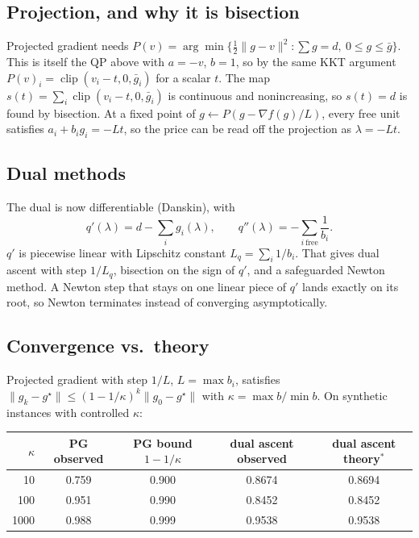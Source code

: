\documentclass[11pt]{article}
\begin{document}
\subsection{Projection, and why it is bisection}
Projected gradient needs $P(v) = \arg\min\{\tfrac12\|g - v\|^2 : \sum g = d,\ 0 \le g \le \bar g\}$. This is itself the QP above with $a = -v$, $b = 1$, so by the same KKT argument $P(v)_i = \operatorname{clip}(v_i - t, 0, \bar g_i)$ for a scalar $t$. The map $s(t) = \sum_i \operatorname{clip}(v_i - t, 0, \bar g_i)$ is continuous and nonincreasing, so $s(t) = d$ is found by bisection. At a fixed point of $g \leftarrow P(g - \nabla f(g)/L)$, every free unit satisfies $a_i + b_i g_i = -Lt$, so the price can be read off the projection as $\lambda = -Lt$.

\subsection{Dual methods}
The dual is now differentiable (Danskin), with
\[
q'(\lambda) = d - \sum_i g_i(\lambda), \qquad q''(\lambda) = -\sum_{i\ \text{free}} \frac{1}{b_i}.
\]
$q'$ is piecewise linear with Lipschitz constant $L_q = \sum_i 1/b_i$. That gives dual ascent with step $1/L_q$, bisection on the sign of $q'$, and a safeguarded Newton method. A Newton step that stays on one linear piece of $q'$ lands exactly on its root, so Newton terminates instead of converging asymptotically.

\subsection{Convergence vs.\ theory}
Projected gradient with step $1/L$, $L = \max b_i$, satisfies $\|g_k - g^\star\| \le (1 - 1/\kappa)^k \|g_0 - g^\star\|$ with $\kappa = \max b / \min b$. On synthetic instances with controlled $\kappa$:

\begin{center}
\begin{tabular}{@{}rcccc@{}}
\toprule
$\kappa$ & PG observed & PG bound $1-1/\kappa$ & dual ascent observed & dual ascent theory$^*$ \\
\midrule
10 & 0.759 & 0.900 & 0.8674 & 0.8694 \\
100 & 0.951 & 0.990 & 0.8452 & 0.8452 \\
1000 & 0.988 & 0.999 & 0.9538 & 0.9538 \\
\bottomrule
\end{tabular}
\end{center}
\end{document}
